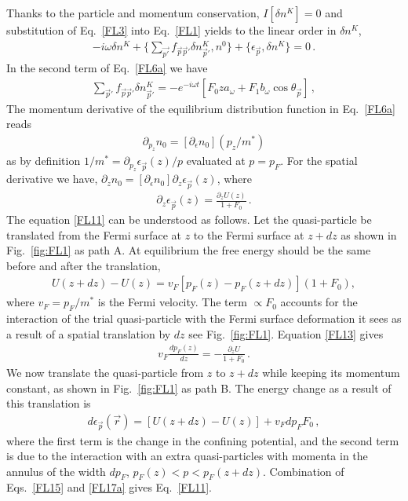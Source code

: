 Thanks to the particle and momentum conservation, $I[\delta n^K]=0$ and substitution of Eq.~\eqref{FL3} into Eq.~\eqref{FL1} yields to the linear order in $\delta n^K$,
\begin{align}\label{FL6a}
- i \omega \delta n^K + \{\sum_{\vec{p'}} f_{\vec{p}\vec{p}'} \delta n^K_{\vec{p}'}, n^0 \} 
+
\{ \epsilon_{\vec{p}},  \delta n^K \} = 0\, .
\end{align}
%
In the second term of Eq.~\eqref{FL6a} we have 
\begin{align}\label{FL7a}
\sum_{\vec{p}'} f_{\vec{p}\vec{p}'} \delta n^K_{\vec{p}'} = 
-e^{ -i \omega t} \left[F_0 z a_{\omega} + F_1 b_{\omega} \cos \theta_{\vec{p}}\right]\, ,
\end{align}
The momentum derivative of the equilibrium distribution function in Eq.~\eqref{FL6a} reads
\begin{align}\label{FL9a}
\partial_{p_z} n_0 =\left[ \partial_{\epsilon} n_0\right]\left( p_z/ m^*\right)
\end{align}
as by definition $1/m^* = \partial_{p_z} \epsilon_{\vec{p}}(z) / p$ evaluated at $p = p_F$.
For the spatial derivative we have, $\partial_z n_0= \left[\partial_{\epsilon} n_0\right] \partial_z \epsilon_{\vec{p}}(z)$, where
\begin{align}\label{FL11}
\partial_z \epsilon_{\vec{p}}(z)=  \frac{ \partial_z U(z) }{ 1 + F_0 }\, .
\end{align}
The equation \eqref{FL11} can be understood as follows.
Let the quasi-particle be translated from the Fermi surface at $z$ to the Fermi surface at $z+dz$ as shown in Fig.~\ref{fig:FL1} as path A.
At equilibrium the free energy should be the same before and after the translation,
\begin{align}\label{FL13}
 U(z\!+\! d z) - U(z) \!=\!v_F\! \left[ p_F(z) - p_F(z\!+\!dz) \right]\!(1 + F_0),
\end{align}
where $v_F = p_F/ m^*$ is the Fermi velocity.
The term $\propto F_0$ accounts for the interaction of the trial quasi-particle with the Fermi surface deformation it sees as a result of a spatial translation by $dz$ see Fig.~\ref{fig:FL1}.
Equation \eqref{FL13} gives 
\begin{align}\label{FL15}
v_F \frac{ d p_F(z) }{ d z } = - \frac{ \partial_z U}{ 1 + F_0}\, .
\end{align}
We now translate the quasi-particle from $z$ to $z+dz$ while keeping its momentum constant, as shown in Fig.~\ref{fig:FL1} as path B.
The energy change as a result of this translation is
\begin{align}\label{FL17a}
d \epsilon_{\vec{p}}(\vec{r}) = \left[U(z+dz) - U(z)\right] + v_F d p_F F_0\, , 
\end{align}
where the first term is the change in the confining potential, and the second term is due to the interaction with an extra quasi-particles with momenta in the annulus of the width $dp_F$, $p_F(z)< p < p_F(z+dz)$.
Combination of Eqs.~\eqref{FL15} and \eqref{FL17a} gives Eq.~\eqref{FL11}.


